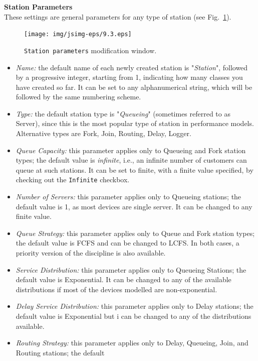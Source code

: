 \noindent \textbf{Station Parameters}\\
These settings are general parameters for any type of station (see
Fig.~\ref{fig:stparam}).
\begin{figure}[htb]
    \begin{center}
        \texttt{[image: img/jsimg-eps/9.3.eps]}
    \end{center}
    \caption{\texttt{Station parameters} modification window.}
    \label{fig:stparam}
\end{figure}
\begin{itemize}
\item \emph{Name:} the default name of each newly created station
is "\emph{Station}", followed by a progressive integer, starting
from 1, indicating how many classes you have created so far. It
can be set to any alphanumerical string, which will be followed by
the same numbering scheme. \item \emph{Type:} the default station
type is "\emph{Queueing}" (sometimes referred to as Server), since
this is the most popular type of station in performance models.
Alternative types are Fork, Join, Routing, Delay, Logger. \item
\emph{Queue Capacity:} this parameter applies only to Queueing and
Fork station types; the default value is \emph{infinite}, i.e., an
infinite number of customers can queue at such stations. It can be
set to finite, with a finite value specified, by checking out the
\texttt{Infinite} checkbox. \item \emph{Number of Servers:} this
parameter applies only to Queueing stations; the default value is
1, as most devices are single server. It can be changed to any
finite value. \item \emph{Queue Strategy:} this parameter applies
only to Queue and Fork station types; the default value is FCFS
and can be changed to LCFS. In both cases, a priority version of
the discipline is also available. \item \emph{Service
Distribution:} this parameter applies only to Queueing Stations;
the default value is Exponential. It can be changed to any of the
available distributions if most of the devices modelled are
non-exponential. \item \emph{Delay Service Distribution:} this
parameter applies only to Delay stations; the default value is
Exponential but i can be changed to any of the distributions
available. \item \emph{Routing Strategy:} this parameter applies
only to Delay, Queueing, Join, and Routing stations; the default

\end{itemize}
